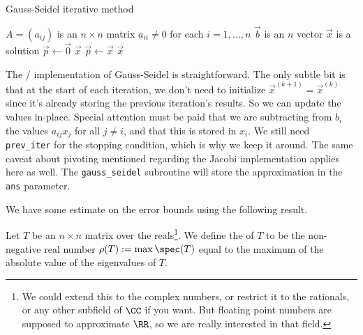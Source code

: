 \begin{algorithm}\label{alg:iterative-linear:gauss-seidel}
  \caption{Gauss-Seidel iterative method}
  \begin{algorithmic}[1]
    \Require $A=(a_{ij})$ is an $n\times n$ matrix
    \Require $a_{ii}\neq0$ for each $i=1,\dots,n$
    \Require $\vec{b}$ is an $n$ vector
    \Ensure $\vec{x}$ is a solution
    \State $\vec{p}\gets\vec{0}$ 
      \EndFor
        \State\Return $\vec{x}$
      \EndIf
      \State $\vec{p}\gets\vec{x}$
    \EndFor
    \State\Return $\vec{x}$
  \EndFunction
\end{algorithmic}
\end{algorithm}

\begin{chunk}
  The \FORTRAN/ implementation of Gauss-Seidel is straightforward. The
  only subtle bit is that at the start of each iteration, we don't need
  to initialize
  $\vec{x}^{(k+1)}=\vec{x}^{(k)}$ since it's already storing the
  previous iteration's results. So we can update the values
  in-place. Special attention must be paid that we are subtracting from
  $b_{i}$ the values $a_{ij}x_{j}$ for all $j\neq i$, and that this is
  stored in $x_{i}$. We still need \verb#prev_iter# for the stopping
  condition, which is why we keep it around.
  The same caveat about pivoting mentioned regarding
  the Jacobi implementation applies here as well. The
  \verb#gauss_seidel# subroutine will store the approximation in the
  \verb#ans# parameter.
  
\end{chunk}

We have some estimate on the error bounds using the following result.

\begin{defn}
Let $T$ be an $n\times n$ matrix over the reals\footnote{We could extend
this to the complex numbers, or restrict it to the rationals, or any
other subfield of $\CC$ if you want. But floating point numbers are
supposed to approximate $\RR$, so we are really interested in that field.}.
We define the  of $T$ to be the non-negative
real number $\rho(T) := \max\spec(T)$ equal to the maximum of the
absolute value of the eigenvalues of $T$.
\end{defn}

